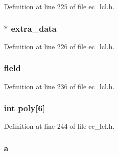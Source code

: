 Definition at line 225 of file ec\+\_\+lcl.\+h.

\subsubsection[{\texorpdfstring{extra\+\_\+data}{extra_data}}]{$\ast$ extra\+\_\+data}\hypertarget{structec__group__st_a278cb953ee6bbe9081e486a5cd8ea868}{}\label{structec__group__st_a278cb953ee6bbe9081e486a5cd8ea868}


Definition at line 226 of file ec\+\_\+lcl.\+h.

\subsubsection[{\texorpdfstring{field}{field}}]{ field}\hypertarget{structec__group__st_a6969353956fcbe63a205705b1c3a96d0}{}\label{structec__group__st_a6969353956fcbe63a205705b1c3a96d0}


Definition at line 236 of file ec\+\_\+lcl.\+h.

\subsubsection[{\texorpdfstring{poly}{poly}}]{\setlength{\rightskip}{0pt plus 5cm}int poly\mbox{[}6\mbox{]}}\hypertarget{structec__group__st_a54bd6c732eb42613c36515f5f879da8a}{}\label{structec__group__st_a54bd6c732eb42613c36515f5f879da8a}


Definition at line 244 of file ec\+\_\+lcl.\+h.

\subsubsection[{\texorpdfstring{a}{a}}]{ a}\hypertarget{structec__group__st_a879ee11fd9920649a3de1387b6c3fa22}{}\label{structec__group__st_a879ee11fd9920649a3de1387b6c3fa22}


